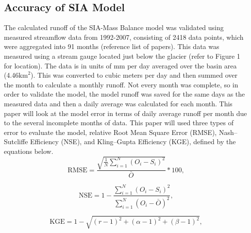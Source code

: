 \documentclass{article}
\begin{document}
\subsection{Accuracy of SIA Model}
The calculated runoff of the SIA-Mass Balance model was validated using measured streamflow data from 1992-2007, consisting of 2418 
data points, which were aggregated into 91 months (reference list of papers). This data was measured using 
a stream gauge located just below the glacier (refer to Figure 1 for location). The data is in units of mm per day averaged over the basin area (4.46$\text{km}^2$). This was  
converted to cubic meters per day and then 
summed over the month to calculate a monthly runoff. Not every month was complete, so in order to validate the model, the model runoff was saved 
for the same days as the measured data and then a daily average was calculated for each month. 
This paper will look at the model error in terms of daily average runoff per month due to the several incomplete months of data. 
This paper will used 
three types of error to evaluate the model, relative Root Mean Square Error (RMSE), Nash–Sutcliffe Efficiency (NSE), and Kling–Gupta Efficiency 
(KGE), defined by the equations below. 
\begin{equation}
    \mathrm{RMSE} = \frac{\sqrt{\frac{1}{N}\sum_{i=1}^{N} \left( O_i - S_i \right)^2}}{\bar{O}}*100,
\end{equation}

\begin{equation}
    \mathrm{NSE} = 1 - \frac{\sum_{i=1}^{N}\left( O_i - S_i \right)^2}{\sum_{i=1}^{N}\left( O_i - \bar{O} \right)^2},
\end{equation}

\begin{equation}
    \mathrm{KGE} = 1 - \sqrt{ (r-1)^2 + (\alpha-1)^2 + (\beta-1)^2 },
\end{equation}
\end{document}
